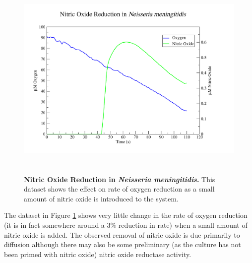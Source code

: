 \begin{figure}[tbp]
 \centering
 \includegraphics[height=10cm, trim=2cm 1cm 4cm 1cm]{./06-noreduction/data/aer-no-data1.pdf}
 \caption[{Nitric Oxide Reduction in \textit{Neisseria meningitidis}.}]{{\bf Nitric Oxide Reduction in \textit{Neisseria meningitidis}.} This dataset shows the effect on rate of oxygen reduction as a small amount of nitric oxide is introduced to the system.}
 \label{fig:nodata1}
\end{figure}
The dataset in Figure \ref{fig:nodata1} shows very little change in the rate of oxygen reduction (it is in fact somewhere around a 3\% reduction in rate) when a small amount of nitric oxide is added. The observed removal of nitric oxide is due primarily to diffusion although there may also be some preliminary (as the culture has not been primed with nitric oxide) nitric oxide reductase activity.


